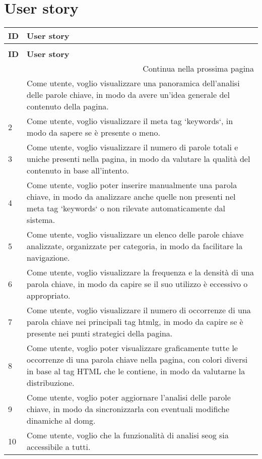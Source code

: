 \newpage

\section{User story}

\renewcommand{\arraystretch}{1.5}
\begin{tabularx}{\textwidth}{lX}
\caption{Tabella delle user story}
\label{tab:user-story} \\
\hline\hline
\textbf{ID} & \textbf{User story}\\
\endfirsthead
    
\caption[]{Tabella delle user story (continua)} \\
\hline\hline
\textbf{ID} & \textbf{User story} \\ 
\endhead
    
\multicolumn{2}{r}{{Continua nella prossima pagina}} \\ 
\endfoot
    
\hline
\endlastfoot

\hline
1 & Come utente, voglio visualizzare una panoramica dell'analisi delle parole chiave, in modo da avere un'idea generale del contenuto della pagina. \\
\hline
2 & Come utente, voglio visualizzare il meta tag `keywords`, in modo da sapere se è presente o meno. \\
\hline
3 & Come utente, voglio visualizzare il numero di parole totali e uniche presenti nella pagina, in modo da valutare la qualità del contenuto in base all'intento. \\
\hline
4 & Come utente, voglio poter inserire manualmente una parola chiave, in modo da analizzare anche quelle non presenti nel meta tag `keywords` o non rilevate automaticamente dal sistema. \\
\hline
5 & Come utente, voglio visualizzare un elenco delle parole chiave analizzate, organizzate per categoria, in modo da facilitare la navigazione. \\
\hline
6 & Come utente, voglio visualizzare la frequenza e la densità di una parola chiave, in modo da capire se il suo utilizzo è eccessivo o appropriato. \\
\hline
7 & Come utente, voglio visualizzare il numero di occorrenze di una parola chiave nei principali tag \gls{htmlg}, in modo da capire se è presente nei punti strategici della pagina. \\
\hline
8 & Come utente, voglio poter visualizzare graficamente tutte le occorrenze di una parola chiave nella pagina, con colori diversi in base al tag HTML che le contiene, in modo da valutarne la distribuzione. \\
\hline
9 & Come utente, voglio poter aggiornare l'analisi delle parole chiave, in modo da sincronizzarla con eventuali modifiche dinamiche al \gls{domg}. \\
\hline
10 & Come utente, voglio che la funzionalità di analisi \gls{seog} sia accessibile a tutti. \\
\end{tabularx}